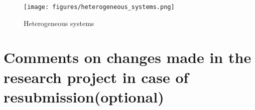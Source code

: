 \begin{figure}[h]
    \centering
    \texttt{[image: figures/heterogeneous\_systems.png]}
    \caption{Heterogeneous systems}
    \label{fig:heterogeneous_systems}
\end{figure}










\section{Comments on changes made in the research project in case of resubmission(optional)}


